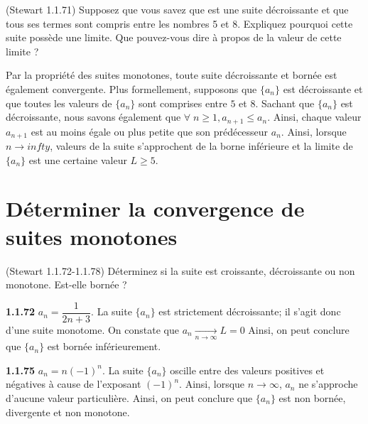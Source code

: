 \documentclass{report}
\begin{document}
    \begin{Exercice}{(Stewart 1.1.71)}{}
        Supposez que vous savez que est une suite décroissante
        et que tous ses termes sont compris entre les nombres 5 et 8.
        Expliquez pourquoi cette suite possède une limite. Que
        pouvez-vous dire à propos de la valeur de cette limite ?
    \end{Exercice}      

    Par la propriété des suites monotones, toute suite décroissante et bornée est également convergente. 
    Plus formellement, supposons que $\{a_n\}$ est décroissante et que toutes les valeurs de 
    $\{a_n\}$ sont comprises entre $5$ et $8$. Sachant que $\{a_n\}$ est décroissante, nous savons également que 
    $\forall \; n \geq 1, a_{n+1} \leq a_n$. Ainsi, chaque valeur $a_{n+1}$ est
    au moins  égale ou plus petite que son prédécesseur $a_n$. Ainsi, lorsque $n \to infty$, 
    valeurs de la suite s'approchent de la borne inférieure et la limite de $\{a_n \}$ 
    est une certaine valeur $L \geq 5$. 


    \section{Déterminer la convergence de suites monotones}

    \begin{Exercice}{(Stewart 1.1.72-1.1.78)}{}
        Déterminez si la suite est croissante, décroissante ou non monotone. Est-elle bornée ?
    \end{Exercice}

    \noindent \textbf{1.1.72} \; \( a_n = \dfrac{1}{2n + 3} \). La suite \( \{a_n \} \) est strictement décroissante; 
    il s'agit donc d'une suite monotome. On constate que $a_n \xrightarrow[n\to \infty]{} L = 0$ 
    Ainsi, on peut conclure que $\{ a_n\}$ est bornée inférieurement. 
    
    \vspace{2em}
    \noindent \textbf{1.1.75} \; \( a_n = n(-1)^n \). La suite \( \{a_n \} \) oscille entre des valeurs 
    positives et négatives à cause de l'exposant $(-1)^n$. Ainsi, lorsque $n\to \infty$, 
    $a_n$ ne s'approche d'aucune valeur particulière. Ainsi, on peut conclure que 
    $\{a_n \}$ est non bornée, divergente et non monotone. 
\end{document}
